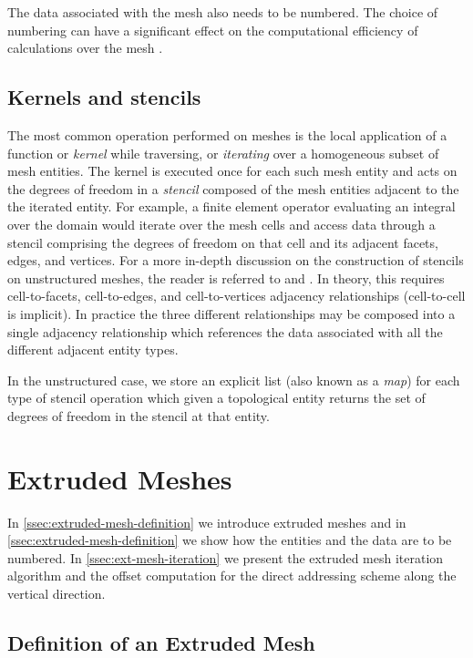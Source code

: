 \documentclass[11pt, a4paper]{scrartcl}
\begin{document}
The data associated with the mesh also needs to be numbered.  The
choice of numbering can have a significant effect on the computational
efficiency of calculations over the mesh
\citep{Gunther:2006,Lange:2016,Yoon:2005}.

\subsection{Kernels and stencils}
\label{ssec:kernels-stencils}

The most common operation performed on meshes is the local application
of a function or \emph{kernel} while traversing, or \emph{iterating}
over a homogeneous subset of mesh entities.  The kernel is executed
once for each such mesh entity and acts on the degrees of freedom in a
\emph{stencil} composed of the mesh entities adjacent to the the
iterated entity.  For example, a finite element operator evaluating an
integral over the domain would iterate over the mesh cells and access
data through a stencil comprising the degrees of freedom on that cell
and its adjacent facets, edges, and vertices.  For a more in-depth
discussion on the construction of stencils on unstructured meshes, the
reader is referred to \cite{Logg:2009} and \cite{Knepley:2009}.  In
theory, this requires cell-to-facets, cell-to-edges, and
cell-to-vertices adjacency relationships (cell-to-cell is
implicit). In practice the three different relationships may be
composed into a single adjacency relationship which references the
data associated with all the different adjacent entity types.

In the unstructured case, we store an explicit list (also known as a
\textit{map})  for each type of stencil operation which given a
topological entity  returns the set of degrees of freedom in the
stencil at that entity.

\section{Extruded Meshes}
\label{sec:extruded-meshes}

In \autoref{ssec:extruded-mesh-definition} we introduce extruded
meshes and in \autoref{ssec:extruded-mesh-definition} we show how the
entities and the data are to be numbered. In
\autoref{ssec:ext-mesh-iteration} we present the extruded mesh
iteration algorithm and the offset computation for the direct
addressing scheme along the vertical direction.

\subsection{Definition of an Extruded Mesh}
\label{ssec:extruded-mesh-definition}
\end{document}

